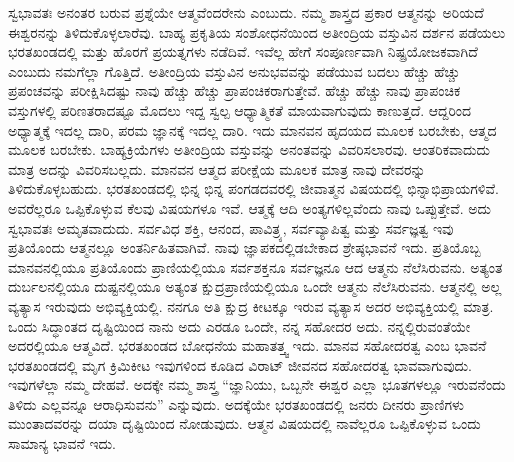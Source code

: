 ಸ್ವಭಾವತಃ ಅನಂತರ ಬರುವ ಪ್ರಶ್ನೆಯೇ ಆತ್ಮವೆಂದರೇನು ಎಂಬುದು. ನಮ್ಮ ಶಾಸ್ತ್ರದ ಪ್ರಕಾರ ಆತ್ಮನನ್ನು ಅರಿಯದೆ ಈಶ್ವರನನ್ನು ತಿಳಿದುಕೊಳ್ಳಲಾರೆವು. ಬಾಹ್ಯ ಪ್ರಕೃತಿಯ ಸಂಶೋಧನೆಯಿಂದ ಅತೀಂದ್ರಿಯ ವಸ್ತುವಿನ ದರ್ಶನ ಪಡೆಯಲು ಭರತಖಂಡದಲ್ಲಿ ಮತ್ತು ಹೊರಗೆ ಪ್ರಯತ್ನಗಳು ನಡೆದಿವೆ. ಇವೆಲ್ಲ ಹೇಗೆ ಸಂಪೂರ್ಣವಾಗಿ ನಿಷ್ಪ್ರಯೋಜಕವಾಗಿದೆ ಎಂಬುದು ನಮಗೆಲ್ಲಾ ಗೊತ್ತಿದೆ. ಅತೀಂದ್ರಿಯ ವಸ್ತುವಿನ ಅನುಭವವನ್ನು ಪಡೆಯುವ ಬದಲು ಹೆಚ್ಚು ಹೆಚ್ಚು ಪ್ರಪಂಚವನ್ನು ಪರೀಕ್ಷಿಸಿದಷ್ಟು ನಾವು ಹೆಚ್ಚು ಹೆಚ್ಚು ಪ್ರಾಪಂಚಿಕರಾಗುತ್ತೇವೆ. ಹೆಚ್ಚು ಹೆಚ್ಚು ನಾವು ಪ್ರಾಪಂಚಿಕ ವಸ್ತುಗಳಲ್ಲಿ ಪರಿಣತರಾದಷ್ಟೂ ಮೊದಲು ಇದ್ದ ಸ್ವಲ್ಪ ಆಧ್ಯಾತ್ಮಿಕತೆ ಮಾಯವಾಗುವುದು ಕಾಣುತ್ತದೆ. ಆದ್ದರಿಂದ ಅಧ್ಯಾತ್ಮಕ್ಕೆ ಇದಲ್ಲ ದಾರಿ, ಪರಮ ಜ್ಞಾನಕ್ಕೆ ಇದಲ್ಲ ದಾರಿ. ಇದು ಮಾನವನ ಹೃದಯದ ಮೂಲಕ ಬರಬೇಕು, ಆತ್ಮದ ಮೂಲಕ ಬರಬೇಕು. ಬಾಹ್ಯಕ್ರಿಯೆಗಳು ಅತೀಂದ್ರಿಯ ವಸ್ತುವನ್ನು ಅನಂತವನ್ನು ವಿವರಿಸಲಾರವು. ಆಂತರಿಕವಾದುದು ಮಾತ್ರ ಅದನ್ನು ವಿವರಿಸಬಲ್ಲದು. ಮಾನವನ ಆತ್ಮದ ಪರೀಕ್ಷೆಯ ಮೂಲಕ ಮಾತ್ರ ನಾವು ದೇವರನ್ನು ತಿಳಿದುಕೊಳ್ಳಬಹುದು. ಭರತಖಂಡದಲ್ಲಿ ಭಿನ್ನ ಭಿನ್ನ ಪಂಗಡದವರಲ್ಲಿ ಜೀವಾತ್ಮನ ವಿಷಯದಲ್ಲಿ ಭಿನ್ನಾಭಿಪ್ರಾಯಗಳಿವೆ. ಅವರೆಲ್ಲರೂ ಒಪ್ಪಿಕೊಳ್ಳುವ ಕೆಲವು ವಿಷಯಗಳೂ ಇವೆ. ಆತ್ಮಕ್ಕೆ ಆದಿ ಅಂತ್ಯಗಳಿಲ್ಲವೆಂದು ನಾವು ಒಪ್ಪುತ್ತೇವೆ. ಅದು ಸ್ವಭಾವತಃ ಅಮೃತವಾದುದು. ಸರ್ವವಿಧ ಶಕ್ತಿ, ಆನಂದ, ಪಾವಿತ್ರ್ಯ, ಸರ್ವವ್ಯಾಪಿತ್ವ ಮತ್ತು ಸರ್ವಜ್ಞತ್ವ ಇವು ಪ್ರತಿಯೊಂದು ಆತ್ಮನಲ್ಲೂ ಅಂತರ್ನಿಹಿತವಾಗಿವೆ. ನಾವು ಜ್ಞಾಪಕದಲ್ಲಿಡ\-ಬೇಕಾದ ಶ್ರೇಷ್ಠಭಾವನೆ ಇದು. ಪ್ರತಿಯೊಬ್ಬ ಮಾನವನಲ್ಲಿಯೂ ಪ್ರತಿಯೊಂದು ಪ್ರಾಣಿಯಲ್ಲಿಯೂ ಸರ್ವಶಕ್ತನೂ ಸರ್ವಜ್ಞನೂ ಆದ ಆತ್ಮನು ನೆಲೆಸಿರುವನು. ಅತ್ಯಂತ ದುರ್ಬಲನಲ್ಲಿಯೂ ದುಷ್ಟನಲ್ಲಿಯೂ ಅತ್ಯಂತ ಕ್ಷುದ್ರಪ್ರಾಣಿಯಲ್ಲಿಯೂ ಒಂದೇ ಆತ್ಮನು ನೆಲೆಸಿರುವನು. ಆತ್ಮನಲ್ಲಿ ಅಲ್ಲ ವ್ಯತ್ಯಾಸ ಇರುವುದು ಅಭಿವ್ಯಕ್ತಿಯಲ್ಲಿ. ನನಗೂ ಅತಿ ಕ್ಷುದ್ರ ಕೀಟಕ್ಕೂ ಇರುವ ವ್ಯತ್ಯಾಸ ಅದರ ಅಭಿವ್ಯಕ್ತಿಯಲ್ಲಿ ಮಾತ್ರ. ಒಂದು ಸಿದ್ಧಾಂತದ ದೃಷ್ಟಿಯಿಂದ ನಾನು ಅದು ಎರಡೂ ಒಂದೇ, ನನ್ನ ಸಹೋದರ ಅದು. ನನ್ನಲ್ಲಿರುವಂತೆಯೇ ಅದರಲ್ಲಿಯೂ ಆತ್ಮವಿದೆ. ಭರತಖಂಡದ ಬೋಧನೆಯ ಮಹಾತತ್ತ್ವ ಇದು. ಮಾನವ ಸಹೋದರತ್ವ ಎಂಬ ಭಾವನೆ ಭರತಖಂಡದಲ್ಲಿ ಮೃಗ ಕ್ರಿಮಿಕೀಟ ಇವುಗಳಿಂದ ಕೂಡಿದ ವಿರಾಟ್​ ಜೀವನದ ಸಹೋದರತ್ವ ಭಾವವಾಗುವುದು. ಇವುಗಳೆಲ್ಲಾ ನಮ್ಮ ದೇಹವೆ. ಅದಕ್ಕೇ ನಮ್ಮ ಶಾಸ್ತ್ರ “ಜ್ಞಾನಿಯು, ಒಬ್ಬನೇ ಈಶ್ವರ ಎಲ್ಲಾ ಭೂತಗಳಲ್ಲೂ ಇರುವನೆಂದು ತಿಳಿದು ಎಲ್ಲವನ್ನೂ ಆರಾಧಿಸುವನು” ಎನ್ನುವುದು. ಅದಕ್ಕೆಯೇ ಭರತಖಂಡದಲ್ಲಿ ಜನರು ದೀನರು ಪ್ರಾಣಿಗಳು ಮುಂತಾದವರನ್ನು ದಯಾ ದೃಷ್ಟಿಯಿಂದ ನೋಡುವುದು. ಆತ್ಮನ ವಿಷಯದಲ್ಲಿ ನಾವೆಲ್ಲರೂ ಒಪ್ಪಿಕೊಳ್ಳುವ ಒಂದು ಸಾಮಾನ್ಯ ಭಾವನೆ ಇದು. 

